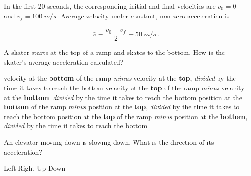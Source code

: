 \documentclass{exam}
\begin{document}
\begin{questions}
\begin{solutionorbox}[2.5in]

In the first 20 seconds, the corresponding initial and final velocities are $v_0 = 0$ and $v_f = \SI{100}{m/s}$. Average velocity under constant, non-zero acceleration is

\begin{equation*}
    \bar{v} = \frac{v_0 + v_f}{2} = \SI{50}{m/s}\ .
\end{equation*}

\end{solutionorbox}

\question %
A skater starts at the top of a ramp and skates to the bottom. How is the skater's average acceleration calculated?

\begin{choices}
\CorrectChoice velocity at the \textbf{bottom} of the ramp \textit{minus} velocity at the \textbf{top}, \textit{divided} by the time it takes to reach the bottom
\choice velocity at the \textbf{top} of the ramp \textit{minus} velocity at the \textbf{bottom}, \textit{divided} by the time it takes to reach the bottom
\choice position at the \textbf{bottom} of the ramp \textit{minus} position at the \textbf{top}, \textit{divided} by the time it takes to reach the bottom
\choice position at the \textbf{top} of the ramp \textit{minus} position at the \textbf{bottom}, \textit{divided} by the time it takes to reach the bottom
\end{choices}


\question %
An elevator moving down is slowing down. What is the direction of its acceleration?

\begin{choices}
\choice Left
\choice Right 
\choice Up
\correctchoice Down
\end{choices}







\end{questions}
\end{document}
